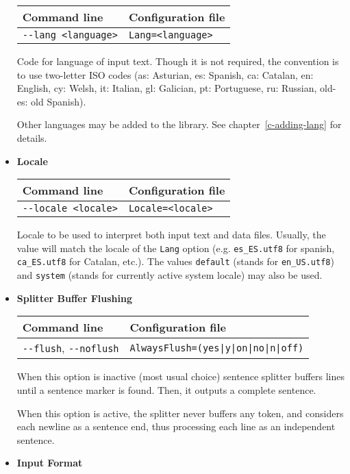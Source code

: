 \documentclass[a4paper]{book}
\begin{document}
\begin{itemize}
\begin{tabular}{|l|l|}
Command line       & Configuration file   \\ \hline
\verb#--lang <language>#  & \verb#Lang=<language>#    \\ \hline
\end{tabular}

   Code for language of input text. Though it is not required, the
   convention is to use two-letter ISO codes (as: Asturian, es:
   Spanish, ca: Catalan, en: English, cy: Welsh, it: Italian, gl:
   Galician, pt: Portuguese, ru: Russian, old-es: old Spanish).

   Other languages may be added to the library. See
   chapter~\ref{c-adding-lang} for details.

\item {\bf Locale}

\begin{tabular}{|l|l|}
Command line       & Configuration file   \\ \hline
\verb#--locale <locale>#  & \verb#Locale=<locale>#    \\ \hline
\end{tabular}

  Locale to be used to interpret both input text and data files.
  Usually, the value will match the locale of the \verb#Lang# option
  (e.g. \verb#es_ES.utf8# for spanish, \verb#ca_ES.utf8# for
  Catalan, etc.).  The values \verb#default# (stands for
  \verb#en_US.utf8#) and \verb#system# (stands for currently active
  system locale) may also be used.

\item {\bf Splitter Buffer Flushing}

\begin{tabular}{|l|l|}
Command line                      & Configuration file   \\ \hline
\verb#--flush#, \verb#--noflush#  & \verb#AlwaysFlush=(yes|y|on|no|n|off)#   \\ \hline
\end{tabular}

   When this option is inactive (most usual choice) sentence splitter
   buffers lines until a sentence marker is found. Then, it outputs a
   complete sentence. 

   When this option is active, the splitter never buffers any token,
   and considers each newline as a sentence end, thus processing each
   line as an independent sentence.

\item {\bf Input Format}


\end{itemize}
\end{document}
